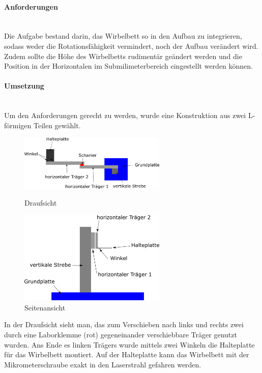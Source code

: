 \paragraph{Anforderungen}

\hfill \\
Die Aufgabe bestand darin, das Wirbelbett so in den Aufbau zu integrieren, sodass weder die Rotationsfähigkeit vermindert, noch der Aufbau verändert wird. Zudem sollte die Höhe des Wirbelbetts rudimentär geändert werden und die Position in der Horizontalen im Submilimeterbereich eingestellt werden können. 


\paragraph{Umsetzung}
\hfill \\
Um den Anforderungen gerecht zu werden, wurde eine Konstruktion aus zwei L-förmigen Teilen gewählt. 

\begin{figure}[h]
	\begin{minipage}[hbt]{7cm}
		\centering
		\includegraphics[width=7cm]{Halterung_Lichtstreu_Vogel.png}
		\caption{Draufsicht}
	\end{minipage}
	\hfill
	\begin{minipage}[hbt]{7cm}
		\centering
		\includegraphics[width=7cm]{Halterung_Lichtstreu_Seite.png}
		\caption{Seitenansicht}
	\end{minipage}
\end{figure}


In der Draufsicht sieht man, das zum Verschieben nach links und rechts zwei durch eine Laborklemme (rot) gegeneinander verschiebbare Träger genutzt wurden. Ans Ende es linken Trägers wurde mittels zwei Winkeln die Halteplatte für das Wirbelbett montiert. Auf der Halteplatte kann das Wirbelbett mit der Mikrometerschraube exakt in den Laserstrahl gefahren werden.


